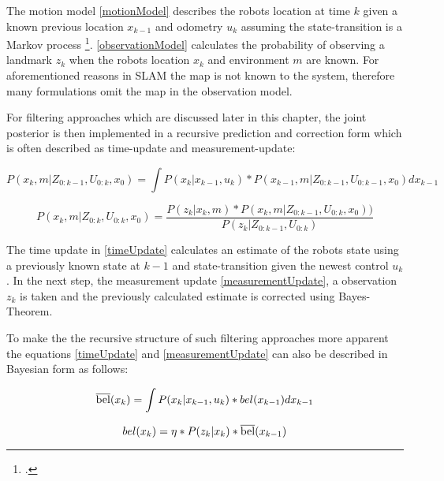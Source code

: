 The motion model \ref{motionModel} describes the robots location at time $ k $ given a known previous location $ x_{k-1} $ and odometry $ u_{k} $ assuming the state-transition is a Markov process \footcite{haeneltMarvoModel2006}.
\ref{observationModel} calculates the probability of observing a landmark $ z_{k} $ when the robots location $ x_{k} $ and environment $ m $ are known. For aforementioned reasons in SLAM the map is not known to the system, therefore many formulations omit the map in the observation model.


For filtering approaches which are discussed later in this chapter, the joint posterior is then implemented in a recursive prediction and correction form which is often described as time-update and measurement-update:

\begin{equation}\label{timeUpdate}
	P(x_{k}, m | Z_{0:k-1}, U_{0:k}, x_{0}) = \int P(x_{k} | x_{k-1}, u_{k}) * P(x_{k-1}, m | Z_{0:k-1}, U_{0:k-1}, x_{0}) dx_{k-1}
\end{equation}


\begin{equation}\label{measurementUpdate}
	P(x_{k}, m | Z_{0:k}, U_{0:k}, x_{0}) = \frac{P(z_{k} | x_{k}, m) * P(x_{k}, m | Z_{0:k-1}, U_{0:k}, x_{0}))}{P(z_{k} | Z_{0:k-1}, U_{0:k})}
\end{equation}

The time update in \ref{timeUpdate} calculates an estimate of the robots state using a previously known state at $ k - 1 $ and state-transition given the newest control $ u_{k} $.
In the next step, the measurement update \ref{measurementUpdate}, a observation $z_{k} $ is taken and the previously calculated estimate is corrected using Bayes-Theorem. 

To make the the recursive structure of such filtering approaches more apparent the equations \ref{timeUpdate} and \ref{measurementUpdate} can also be described in Bayesian form as follows:

\begin{equation}\label{timeUpdateBayes}
	\overline{\rm bel}(x_{k}) = \int P(x_{k} | x_{k-1}, u_{k}) * bel(x_{k-1}) dx_{k-1}
\end{equation}


\begin{equation}\label{measurementUpdateBayes}
	bel(x_{k}) = \eta * P(z_{k} | x_{k}) * \overline{\rm bel}(x_{k-1})
\end{equation}

